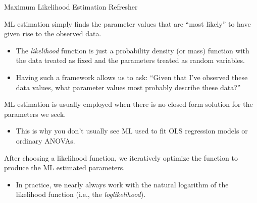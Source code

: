 \documentclass{beamer}
\begin{document}
\begin{frame}[shrink = 5]{Maximum Likelihood Estimation Refresher}

  ML estimation simply finds the parameter values that are ``most
  likely'' to have given rise to the observed data.
  \vspace{6pt}
  \begin{itemize}
    \item The \emph{likelihood} function is just a probability density
      (or mass) function with the data treated as fixed and the
      parameters treated as random variables.
    \vspace{6pt}
    \item Having such a framework allows us to ask: ``Given that I've
      observed these data values, what parameter values most probably
      describe these data?''
  \end{itemize}
  \vspace{12pt}
  \pause
  ML estimation is usually employed when there is no closed form
  solution for the parameters we seek.
  \begin{itemize}
    \item This is why you don't usually see ML used to fit OLS
      regression models or ordinary ANOVAs.
  \end{itemize}
  \vspace{12pt}
  After choosing a likelihood function, we iteratively
  optimize the function to produce the ML estimated parameters.
  \begin{itemize}
  \item In practice, we nearly always work with the natural logarithm
    of the likelihood function (i.e., the \emph{loglikelihood}).
  \end{itemize}

\end{frame}
\end{document}
